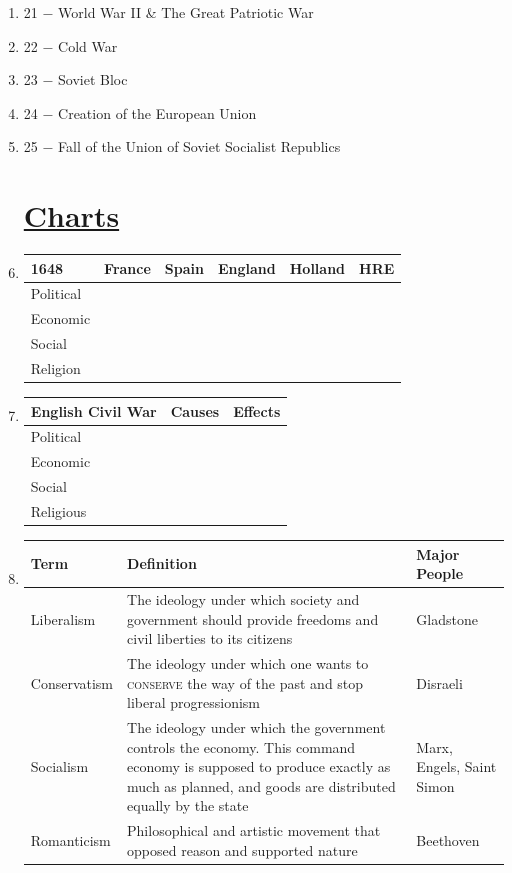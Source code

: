 \documentclass[12pt]{article}
\begin{document}
\begin{enumerate}
\item 21 $-$ World War II \& The Great Patriotic War

\item 22 $-$ Cold War

\item 23 $-$ Soviet Bloc

\item 24 $-$ Creation of the European Union

\item 25 $-$ Fall of the Union of Soviet Socialist Republics

\section{\underline{Charts}}

\item \begin{tabular}{|l|l|l|l|l|l|}

\hline
1648 & France & Spain & England & Holland & HRE \\
\hline
Political & & & & & \\
\hline
Economic & & & & & \\
\hline
Social & & & & & \\
\hline
Religion & & & & & \\
\hline


\end{tabular}

\item \begin{tabular}{|l|l|l|}

\hline
English Civil War & Causes & Effects \\
\hline
Political & & \\
\hline
Economic & & \\
\hline
Social & & \\
\hline
Religious & & \\
\hline

\end{tabular}

\item \begin{tabular}{|p{}|p{}|p{}|}

\hline
Term & Definition & Major People \\
\hline
Liberalism & The ideology under which society and government should provide freedoms and civil liberties to its citizens & Gladstone \\
\hline
Conservatism & The ideology under which one wants to \textsc{conserve} the way of the past and stop liberal progressionism & Disraeli \\
\hline
Socialism & The ideology under which the government controls the economy. This command economy is supposed to produce exactly as much as planned, and goods are distributed equally by the state  & Marx, Engels, Saint Simon \\
\hline
Romanticism & Philosophical and artistic movement that opposed reason and supported nature & Beethoven \\
\hline
\end{tabular}


\end{enumerate}
\end{document}
